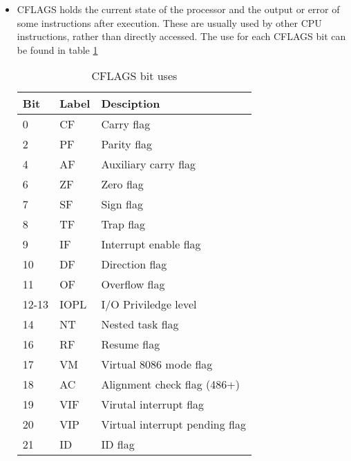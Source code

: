 \documentclass[a4paper,11pt]{report}
\begin{document}
\begin{itemize}
\begin{itemize}
						\end{itemize}
					\item CFLAGS holds the current state of the processor and the output or error of some instructions after execution. 
						These are usually used by other CPU instructions, rather than directly accessed.
						The use for each CFLAGS bit can be found in table \ref{tab:CFLAGSBits} 
						\begin{table}[htb]
							\centering
							\begin{tabular}{| l | l | l |}
								\hline
								\textbf{Bit} &  \textbf{Label} &   \textbf{Desciption} \\\hline 
								0   &   CF &     Carry flag \\ \hline
								2   &   PF   &   Parity flag \\ \hline
								4   &   AF   &   Auxiliary carry flag \\ \hline
								6   &   ZF   &   Zero flag \\ \hline
								7   &   SF   &   Sign flag \\ \hline
								8   &   TF   &   Trap flag \\ \hline
								9   &   IF   &   Interrupt enable flag \\ \hline
								10  &   DF   &   Direction flag \\ \hline
								11  &   OF   &   Overflow flag \\ \hline
								12-13 & IOPL &   I/O Priviledge level \\ \hline
								14  &   NT   &   Nested task flag \\ \hline
								16  &   RF   &   Resume flag \\ \hline
								17  &   VM   &   Virtual 8086 mode flag \\ \hline
								18  &   AC   &   Alignment check flag (486+) \\ \hline
								19  &   VIF  &   Virutal interrupt flag \\ \hline
								20  &   VIP  &   Virtual interrupt pending flag \\ \hline
								21  &   ID   &   ID flag \\ \hline
						\end{tabular}
						\caption{CFLAGS bit uses}
						\label{tab:CFLAGSBits}
					\end{table}
				\end{itemize}
				
\end{document}
